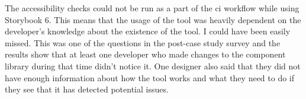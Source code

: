 \documentclass{master_thesis}
\begin{document}
The accessibility checks could not be run as a part of the \ac{ci} workflow while using Storybook 6. This means that the usage of the tool was heavily dependent on the developer's knowledge about the existence of the tool. I could have been easily missed. This was one of the questions in the post-case study survey and the results show that at least one developer who made changes to the component library during that time didn't notice it. One designer also said that they did not have enough information about how the tool works and what they need to do if they see that it has detected potential issues.
\end{document}

